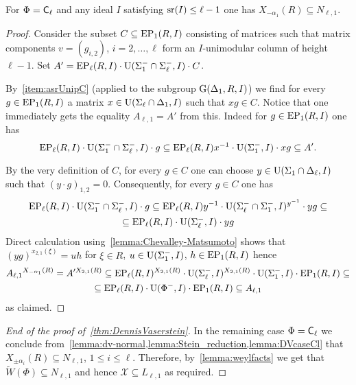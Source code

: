 \begin{lemma} \label{lemma:DVcaseCl}
For $\Phi=\mathsf{C}_\ell$ and any ideal $I$ satisfying $\operatorname{sr}(I) \leq \ell-1$ one has $X_{-\alpha_1}(R) \subseteq N_{\ell, 1}$.
\end{lemma}
\begin{proof}
Consider the subset $C \subseteq \operatorname{EP}_1(R, I)$ consisting of matrices such that matrix components $v=(g_{i,2})$, $i=2,\ldots, \ell$ form an $I$-unimodular column of height $\ell-1$.
Set $A' = \operatorname{EP}_\ell(R, I) \cdot \operatorname{U}(\Sigma_1^- \cap \Sigma_\ell^-, I) \cdot C$.

By~\cref{item:asrUnipC} (applied to the subgroup $\operatorname{G}(\Delta_1, R, I)$) we find for every $g \in \operatorname{EP}_1(R, I)$ a matrix $x \in \operatorname{U}(\Sigma_\ell \cap \Delta_1, I)$ such that $xg \in C$.  
Notice that one immediately gets the equality $A_{\ell, 1} = A'$ from this.
Indeed for $g\in \operatorname{EP}_1(R, I)$ one has
\begin{equation*} \operatorname{EP}_\ell(R, I) \cdot \operatorname{U}(\Sigma_1^- \cap \Sigma_\ell^-, I) \cdot g \subseteq 
 \operatorname{EP}_\ell(R, I)x^{-1}  \cdot \operatorname{U}(\Sigma_1^-, I) \cdot xg \subseteq A'. \end{equation*}

By the very definition of $C$, for every $g \in C$ one can choose $y \in \operatorname{U}(\Sigma_1 \cap \Delta_\ell, I)$ such that $(y \cdot g)_{1,2} = 0$.
Consequently, for every $g\in C$ one has
\begin{multline*}
 \operatorname{EP}_\ell(R, I) \cdot \operatorname{U}(\Sigma_1^- \cap \Sigma_\ell^-, I) \cdot g \subseteq \operatorname{EP}_\ell(R, I) y^{-1} \cdot \operatorname{U}(\Sigma_\ell^-\cap \Sigma_1^-, I)^{y^{-1}} \cdot y g \subseteq \\
  \subseteq \operatorname{EP}_\ell(R, I) \cdot \operatorname{U}(\Sigma_\ell^-, I) \cdot y g
\end{multline*}
Direct calculation using~\cref{lemma:Chevalley-Matsumoto} shows that $(yg)^{x_{2,1}(\xi)} = u h$ for $\xi \in R$, $u \in \operatorname{U}(\Sigma_1^-, I)$, $h \in \operatorname{EP}_1(R, I)$ hence
\begin{multline*} {A_{\ell,1}}^{X_{-\alpha_1}(R)} = A'^{X_{2,1}(R)} \subseteq \operatorname{EP}_\ell(R, I)^{X_{2,1}(R)} \cdot \operatorname{U}(\Sigma_\ell^-, I)^{X_{2,1}(R)} \cdot \operatorname{U}(\Sigma_1^-, I) \cdot \operatorname{EP}_1(R, I) \subseteq \\
 \subseteq \operatorname{EP}_\ell(R, I) \cdot \operatorname{U}(\Phi^-, I) \cdot \operatorname{EP}_1(R, I) \subseteq A_{\ell,1} \end{multline*}
 as claimed.
\end{proof}

\begin{proof}[End of the proof of~\cref{thm:DennisVaserstein}]
In the remaining case $\Phi=\mathsf{C}_\ell$ we conclude from~\cref{lemma:dv-normal,lemma:Stein_reduction,lemma:DVcaseCl} that $X_{\pm \alpha_i}(R) \subseteq N_{\ell,1}$, $1\leq i\leq \ell$.
Therefore, by~\cref{lemma:weylfacts} we get that $\widetilde{W}(\Phi) \subseteq N_{\ell,1}$ and hence $\mathcal{X} \subseteq L_{\ell,1}$ as required.
\end{proof}
